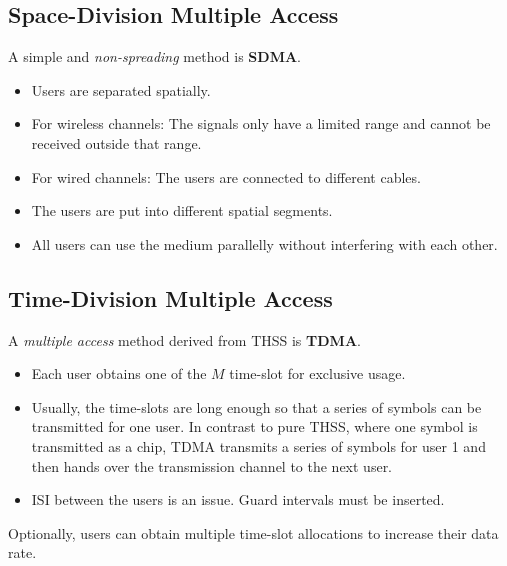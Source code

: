 \begin{refsection}
\subsection{Space-Division Multiple Access}

A simple and \emph{non-spreading} method is  \textbf{\acf{SDMA}}.
\begin{itemize}
	\item Users are separated spatially.
	\item For wireless channels: The signals only have a limited range and cannot be received outside that range.
	\item For wired channels: The users are connected to different cables.
	\item The users are put into different spatial segments.
	\item All users can use the medium parallelly without interfering with each other.
\end{itemize}


\subsection{Time-Division Multiple Access}

A \emph{multiple access} method derived from \ac{THSS} is  \textbf{\acf{TDMA}}.
\begin{itemize}
	\item Each user obtains one of the $M$ time-slot for exclusive usage.
	\item Usually, the time-slots are long enough so that a series of symbols can be transmitted for one user. In contrast to pure \ac{THSS}, where one symbol is transmitted as a chip, \ac{TDMA} transmits a series of symbols for user 1 and then hands over the transmission channel to the next user.
	\item \ac{ISI} between the users is an issue. Guard intervals must be inserted.
\end{itemize}

\begin{remark}
	Optionally, users can obtain multiple time-slot allocations to increase their data rate.
\end{remark}

\begin{figure}[H]
	\centering
\end{figure}
\end{refsection}
